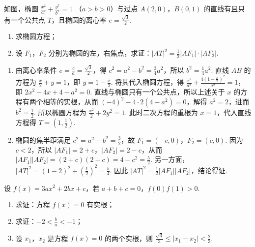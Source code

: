 \begin{problem}
如图，椭圆 \(\frac{x^{2}}{a^{2}} + \frac{y^{2}}{b^{2}} = 1\) （\(a > b > 0\)）与过点 \(A(2,0)\)，\(B(0,1)\) 的直线有且只有一个公共点 \(T\)，且椭圆的离心率 \(e = \frac{\sqrt{3}}{2}\).

\begin{enumerate}
\item 求椭圆方程；
\item 设 \(F_{1}\)，\(F_{2}\) 分别为椭圆的左，右焦点，求证：\(|AT|^{2} = \frac{1}{2} |AF_{1}| \cdot |AF_{2}|\).
\end{enumerate}

\end{problem}

\begin{solution}
\begin{enumerate}
\item 由离心率条件 \(e=\frac ca=\frac{\sqrt3}{2}\)，得 \(c^2=a^2-b^2=\frac34a^2\)，所以 \(b^2=\frac14a^2\). 直线 \(AB\) 的方程为 \(\frac x2+y=1\)，即 \(y=1-\frac x2\). 将其代入椭圆方程，得 \(\frac{x^2}{a^2}+\frac{4(1-\frac x2)^2}{a^2}=1\)，即 \(2x^2-4x+4-a^2=0\). 直线与椭圆只有一个公共点，所以上述关于 \(x\) 的方程有两个相等的实根，从而 \((-4)^2-4\cdot2(4-a^2)=0\)，解得 \(a^2=2\)，进而 \(b^2=\frac12\). 所以椭圆方程为 \(\frac{x^2}{2}+2y^2=1\). 此时二次方程的重根为 \(x=1\)，代入直线方程得 \(T=(1,\frac12)\).

\item 椭圆的焦半距满足 \(c^2=a^2-b^2=\frac32\)，故 \(F_1=(-c,0)\)，\(F_2=(c,0)\). 因为 \(c<2\)，所以 \(\lvert AF_1\rvert=2+c\)，\(\lvert AF_2\rvert=2-c\)，从而 \(\lvert AF_1\rvert\lvert AF_2\rvert=(2+c)(2-c)=4-c^2=\frac52\). 另一方面，\(\lvert AT\rvert^2=(1-2)^2+\left(\frac12\right)^2=\frac54\). 因此 \(\lvert AT\rvert^2=\frac12\lvert AF_1\rvert\lvert AF_2\rvert\)，结论得证.
\end{enumerate}
\end{solution}

\begin{problem}
设 \( f(x) = 3ax^2 + 2bx + c \)，若 \( a + b + c = 0 \)，\( f(0)f(1) > 0 \).

\begin{enumerate}
\item 求证：方程 \( f(x)=0 \) 有实根；
\item 求证：\(-2 < \frac{b}{a} < -1\)；
\item 设 \(x_{1}\)，\(x_{2}\) 是方程 \(f(x) = 0\) 的两个实根，则 \(\frac{\sqrt{3}}{3} \leqslant |x_{1} - x_{2}| < \frac{2}{3}\).
\end{enumerate}
\end{problem}

